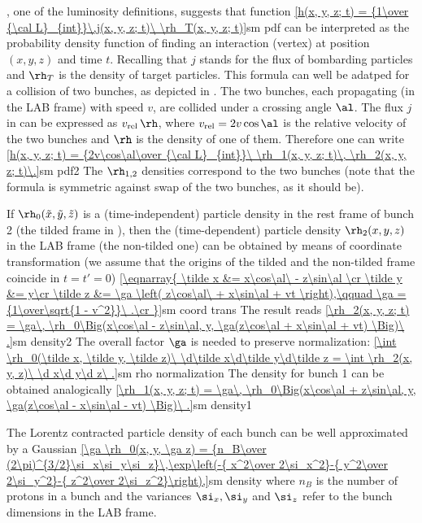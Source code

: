 
, one of the luminosity definitions, suggests that function
\eqref{h(x, y, z; t) = {1\over {\cal L}_{int}}\,j(x, y, z; t)\ \rh_T(x, y, z; t)}{sm pdf}
can be interpreted as the probability density function of finding an interaction (vertex) at position $(x, y, z)$ and time $t$. Recalling that $j$ stands for the flux of bombarding particles and $\rh_T$ is the density of target particles. This formula can well be adatped for a collision of two bunches, as depicted in . The two bunches, each propagating (in the LAB frame) with speed $v$, are collided under a crossing angle $\al$. The flux $j$ in  can be expressed as $v_{\rm rel}\,\rh$, where $v_{\rm rel} = 2v\cos\al$ is the relative velocity of the two bunches and $\rh$ is the density of one of them. Therefore one can write
\eqref{h(x, y, z; t) = {2v\cos\al\over {\cal L}_{int}}\ \rh_1(x, y, z; t)\, \rh_2(x, y, z; t)\.}{sm pdf2}
The $\rh_{1,2}$ densities correspond to the two bunches (note that the formula is symmetric against swap of the two bunches, as it should be).

If $\rh_0(\tilde x, \tilde y, \tilde z)$ is a (time-independent) particle density in the rest frame of bunch 2 (the tilded frame in ), then the (time-dependent) particle density $\rh_2(x, y, z)$ in the LAB frame (the non-tilded one) can be obtained by means of coordinate transformation (we assume that the origins of the tilded and the non-tilded frame coincide in $t=t'=0$)
\eqref{\eqnarray{
\tilde x &= x\cos\al\ - z\sin\al \cr
\tilde y &= y\cr
\tilde z &= \ga \left( z\cos\al\ + x\sin\al + vt \right),\qquad \ga = {1\over\sqrt{1 - v^2}}\ .\cr
}}{sm coord trans}
The result reads
\eqref{\rh_2(x, y, z; t) = \ga\, \rh_0\Big(x\cos\al - z\sin\al, y, \ga(z\cos\al + x\sin\al + vt) \Big)\ .}{sm density2}
The overall factor $\ga$ is needed to preserve normalization:
\eqref{\int \rh_0(\tilde x, \tilde y, \tilde z)\ \d\tilde x\d\tilde y\d\tilde z = \int \rh_2(x, y, z)\ \d x\d y\d z\ .}{sm rho normalization}
The density for bunch 1 can be obtained analogically
\eqref{\rh_1(x, y, z; t) = \ga\, \rh_0\Big(x\cos\al + z\sin\al, y, \ga(z\cos\al - x\sin\al - vt) \Big)\ .}{sm density1}

The Lorentz contracted particle density of each bunch can be well approximated by a Gaussian 
\eqref{\ga \rh_0(x, y, \ga z) = {n_B\over (2\pi)^{3/2}\si_x\si_y\si_z}\,\exp\left(-{ x^2\over 2\si_x^2}-{ y^2\over 2\si_y^2}-{ z^2\over 2\si_z^2}\right),}{sm density}
where $n_B$ is the number of protons in a bunch and the variances $\si_x, \si_y$ and $\si_z$ refer to the bunch dimensions in the LAB frame.

